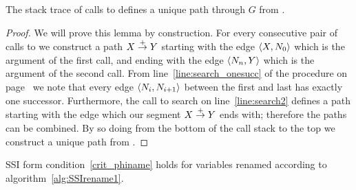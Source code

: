 \documentclass[12pt,titlepage,twoside]{article}
\begin{document}
\begin{lemma}\label{lem:path_construct}
The stack trace of calls to  defines a unique path
through $G$ from .
\end{lemma}
\begin{proof}
We will prove this lemma by construction.  For every consecutive pair
of calls to  we construct a path $X\stackrel{+}{\rightarrow} Y$ starting with the
edge $\left\langle X,N_0 \right\rangle$ which is the argument of the first call, and
ending with the edge $\left\langle N_n, Y \right\rangle$ which is the argument of the
second call.  From line~\ref{line:search_onesucc} of the 
procedure on page~\pageref{line:search_onesucc} we note that every
edge $\left\langle N_i, N_{i+1} \right\rangle$ between the first and last has exactly one
successor.  Furthermore, the call to search on line~\ref{line:search2}
defines a path starting with the edge which our segment $X\stackrel{+}{\rightarrow} Y$
ends with; therefore the paths can be combined.  By so doing from the
bottom of the call stack to the top we construct a unique path from
.
\end{proof}
\begin{lemma}\label{lem:renamephi}
SSI form condition~\ref{crit_phiname} holds for variables renamed
according to algorithm~\ref{alg:SSIrename1}.
\end{lemma}
\end{document}
